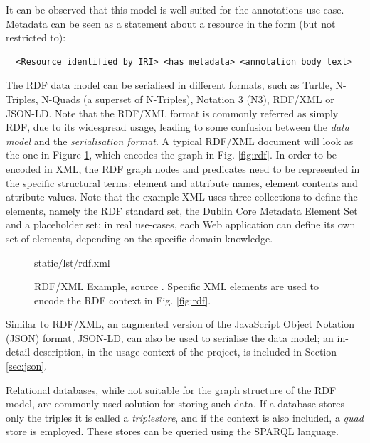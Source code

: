 It can be observed that this model is well-suited for the annotations use
case. Metadata can be seen as a statement about a resource in the form (but not
restricted to):

\begin{verbatim}
  <Resource identified by IRI> <has metadata> <annotation body text>
\end{verbatim}

The RDF data model can be serialised in different formats, such as Turtle,
N-Triples, N-Quads (a superset of N-Triples), Notation 3 (N3), RDF/XML or
JSON-LD. Note that the RDF/XML format is commonly referred as simply RDF, due
to its widespread usage, leading to some confusion between the \textit{data
  model} and the \textit{serialisation format}. A typical RDF/XML document will
look as the one in Figure \ref{lst:rdf}, which encodes the graph in Fig.
\ref{fig:rdf}. In order to be encoded in XML, the RDF graph nodes and
predicates need to be represented in the specific structural terms: element
and attribute names, element contents and attribute values. Note that the
example XML uses three collections to define the elements, namely the RDF
standard set, the Dublin Core Metadata Element Set \cite{ref:dc} and a
placeholder set; in real use-cases, each Web application can define its own set
of elements, depending on the specific domain knowledge.

\begin{figure}[!ht]
  
    {static/lst/rdf.xml}
    \caption[RDF/XML Example]
            {RDF/XML Example, source \cite{ref:rdfsyntax}. Specific XML elements
             are used to encode the RDF context in Fig. \ref{fig:rdf}.}
    \label{lst:rdf}
\end{figure}

Similar to RDF/XML, an augmented version of the JavaScript Object Notation
(JSON) format, JSON-LD, can also be used to serialise the data model; an
in-detail description, in the usage context of the project, is included in
Section \ref{sec:json}.

Relational databases, while not suitable for the graph structure of the RDF
model, are commonly used solution for storing such data. If a database stores
only the triples it is called a \textit{triplestore}, and if the context is
also included, a \textit{quad} store is employed. These stores can be queried
using the SPARQL \cite{ref:sparql} language.


